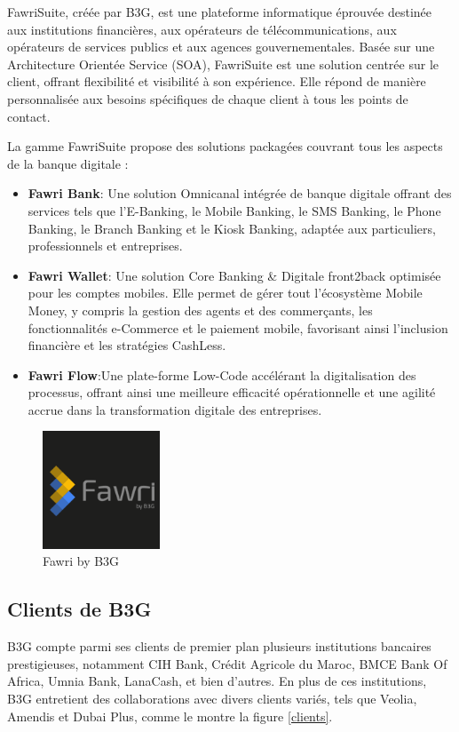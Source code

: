 FawriSuite, créée par B3G, est une plateforme informatique éprouvée destinée aux institutions financières, aux opérateurs de télécommunications, aux opérateurs de services publics et aux agences gouvernementales. Basée sur une Architecture Orientée Service (SOA), FawriSuite est une solution centrée sur le client, offrant flexibilité et visibilité à son expérience. Elle répond de manière personnalisée aux besoins spécifiques de chaque client à tous les points de contact.

La gamme FawriSuite propose des solutions packagées couvrant tous les aspects de la banque digitale :
\begin{itemize}
    \item \textbf{Fawri Bank}: Une solution Omnicanal intégrée de banque digitale offrant des services tels que l'E-Banking, le Mobile Banking, le SMS Banking, le Phone Banking, le Branch Banking et le Kiosk Banking, adaptée aux particuliers, professionnels et entreprises.
    \item \textbf{Fawri Wallet}: Une solution Core Banking \& Digitale front2back optimisée pour les comptes mobiles. Elle permet de gérer tout l'écosystème Mobile Money, y compris la gestion des agents et des commerçants, les fonctionnalités e-Commerce et le paiement mobile, favorisant ainsi l'inclusion financière et les stratégies CashLess.
    \item \textbf{Fawri Flow}:Une plate-forme Low-Code accélérant la digitalisation des processus, offrant ainsi une meilleure efficacité opérationnelle et une agilité accrue dans la transformation digitale des entreprises.


\end{itemize}



\begin{figure}[H]
    \centering
    \includegraphics[width=3.5cm]{Logos/fawri.png}
    \caption{Fawri by B3G}
    \label{fig:my_label} %
\end{figure}

\subsection{Clients de B3G}
\hspace{\parindent}B3G compte parmi ses clients de premier plan plusieurs institutions bancaires prestigieuses, notamment CIH Bank, Crédit Agricole du Maroc, BMCE Bank Of Africa, Umnia Bank,
LanaCash, et bien d'autres. En plus de ces institutions, B3G entretient des collaborations avec divers clients variés, tels que Veolia, Amendis et Dubai Plus, comme le montre la figure \ref*{clients}.

